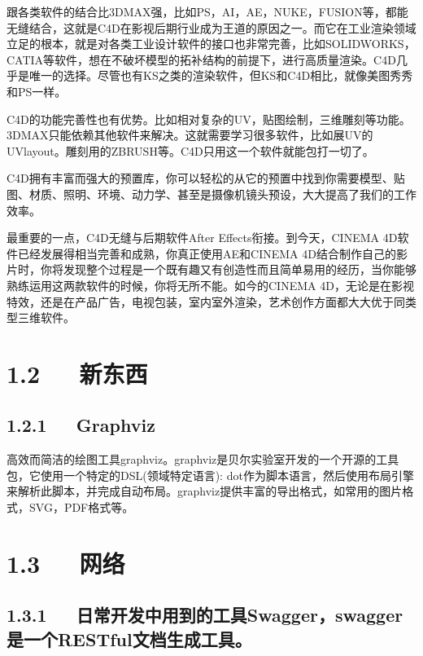 \documentclass[letterpaper,12pt,english]{sphinxmanual}
\begin{document}
跟各类软件的结合比3DMAX强，比如PS，AI，AE，NUKE，FUSION等，都能无缝结合，这就是C4D在影视后期行业成为王道的原因之一。而它在工业渲染领域立足的根本，就是对各类工业设计软件的接口也非常完善，比如SOLIDWORKS，CATIA等软件，想在不破坏模型的拓补结构的前提下，进行高质量渲染。C4D几乎是唯一的选择。尽管也有KS之类的渲染软件，但KS和C4D相比，就像美图秀秀和PS一样。

C4D的功能完善性也有优势。比如相对复杂的UV，贴图绘制，三维雕刻等功能。3DMAX只能依赖其他软件来解决。这就需要学习很多软件，比如展UV的UVlayout。雕刻用的ZBRUSH等。C4D只用这一个软件就能包打一切了。

C4D拥有丰富而强大的预置库，你可以轻松的从它的预置中找到你需要模型、贴图、材质、照明、环境、动力学、甚至是摄像机镜头预设，大大提高了我们的工作效率。

最重要的一点，C4D无缝与后期软件After Effects衔接。到今天，CINEMA 4D软件已经发展得相当完善和成熟，你真正使用AE和CINEMA 4D结合制作自己的影片时，你将发现整个过程是一个既有趣又有创造性而且简单易用的经历，当你能够熟练运用这两款软件的时候，你将无所不能。如今的CINEMA 4D，无论是在影视特效，还是在产品广告，电视包装，室内室外渲染，艺术创作方面都大大优于同类型三维软件。


\section{1.2   新东西}
\label{\detokenize{000misc/extract:id4}}

\subsection{1.2.1   Graphviz}
\label{\detokenize{000misc/extract:graphviz}}
高效而简洁的绘图工具graphviz。graphviz是贝尔实验室开发的一个开源的工具包，它使用一个特定的DSL(领域特定语言):
dot作为脚本语言，然后使用布局引擎来解析此脚本，并完成自动布局。graphviz提供丰富的导出格式，如常用的图片格式，SVG，PDF格式等。


\section{1.3   网络}
\label{\detokenize{000misc/extract:id5}}

\subsection{1.3.1   日常开发中用到的工具Swagger，swagger是一个RESTful文档生成工具。}
\label{\detokenize{000misc/extract:swagger-swaggerrestful}}
\end{document}
